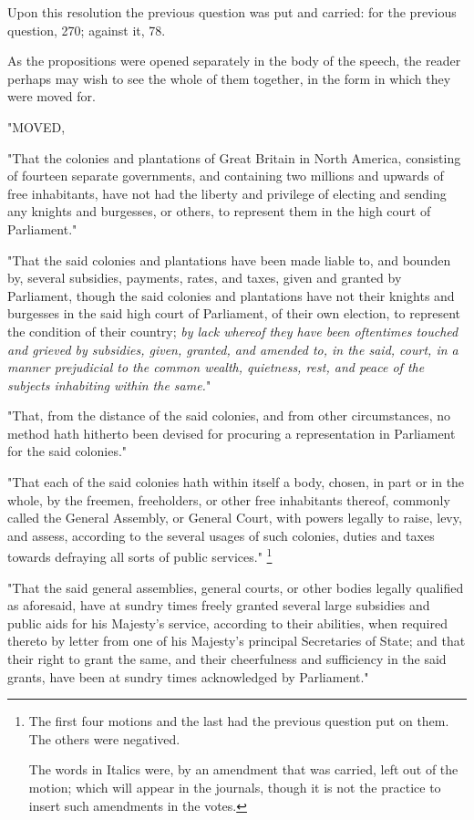 Upon this resolution the previous question was put and carried: for the previous question, 270; against it, 78.

\PRLsep

As the propositions were opened separately in the body of the speech, the reader perhaps may wish to see the whole of them together, in the form in which they were moved for.

"MOVED,

"That the colonies and plantations of Great Britain in North America, consisting of fourteen separate governments, and containing two millions and upwards of free inhabitants, have not had the liberty and privilege of electing and sending any knights and burgesses, or others, to represent them in the high court of Parliament."

"That the said colonies and plantations have been made liable to, and bounden by, several subsidies, payments, rates, and taxes, given and granted by Parliament, though the said colonies and plantations have not their knights and burgesses in the said high court of Parliament, of their own election, to represent the condition of their country; 
\textit{by lack whereof they have been oftentimes touched and grieved by subsidies, given, granted, and amended to, in the said, court, in a manner prejudicial to the common wealth, quietness, rest, and peace of the subjects inhabiting within the same.}"

"That, from the distance of the said colonies, and from other circumstances, no method hath hitherto been devised for procuring a representation in Parliament for the said colonies."

"That each of the said colonies hath within itself a body, chosen, in part or in the whole, by the freemen, freeholders, or other free inhabitants thereof, commonly called the General Assembly, or General Court, with powers legally to raise, levy, and assess, according to the several usages of such colonies, duties and taxes towards defraying all sorts of public services."
\footnote{The first four motions and the last had the previous question put on them. The others were negatived.

The words in Italics were, by an amendment that was carried, left out of the motion; which will appear in the journals, though it is not the practice to insert such amendments in the votes.
}

"That the said general assemblies, general courts, or other bodies legally qualified as aforesaid, have at sundry times freely granted several large subsidies and public aids for his Majesty's service, according to their abilities, when required thereto by letter from one of his Majesty's principal Secretaries of State; and that their right to grant the same, and their cheerfulness and sufficiency in the said grants, have been at sundry times acknowledged by Parliament."

